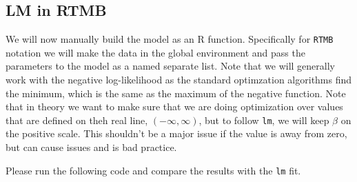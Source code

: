 \documentclass[
]{article}
\begin{document}
\hypertarget{lm-in-rtmb}{%
\subsection{LM in RTMB}\label{lm-in-rtmb}}

We will now manually build the model as an R function. Specifically for
\texttt{RTMB} notation we will make the data in the global environment
and pass the parameters to the model as a named separate list. Note that
we will generally work with the negative log-likelihood as the standard
optimzation algorithms find the minimum, which is the same as the
maximum of the negative function. Note that in theory we want to make
sure that we are doing optimization over values that are defined on theh
real line, \((-\infty, \infty)\), but to follow \texttt{lm}, we will
keep \(\beta\) on the positive scale. This shouldn't be a major issue if
the value is away from zero, but can cause issues and is bad practice.

Please run the following code and compare the results with the
\texttt{lm} fit.
\end{document}
